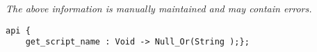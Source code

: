 \label{api:Kludge}

{\tiny \it The above information is manually maintained and may contain errors.}
\begin{verbatim}
api {
    get_script_name : Void -> Null_Or(String );};
\end{verbatim}
